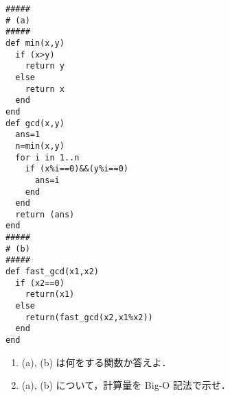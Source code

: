 \documentclass[12pt]{article}
\begin{document}
  \begin{lstlisting}[name=gcd]
#####
# (a)
#####
def min(x,y)
  if (x>y)
    return y
  else
    return x
  end
end
def gcd(x,y)
  ans=1
  n=min(x,y)
  for i in 1..n
    if (x%i==0)&&(y%i==0)
      ans=i
    end
  end
  return (ans)
end
#####
# (b)
#####
def fast_gcd(x1,x2)
  if (x2==0)
    return(x1)
  else
    return(fast_gcd(x2,x1%x2))
  end
end

  \end{lstlisting}
  \begin{enumerate}
\item (a), (b) は何をする関数か答えよ．
\item (a), (b) について，計算量を Big-O 記法で示せ．
  \end{enumerate}
\end{document}
